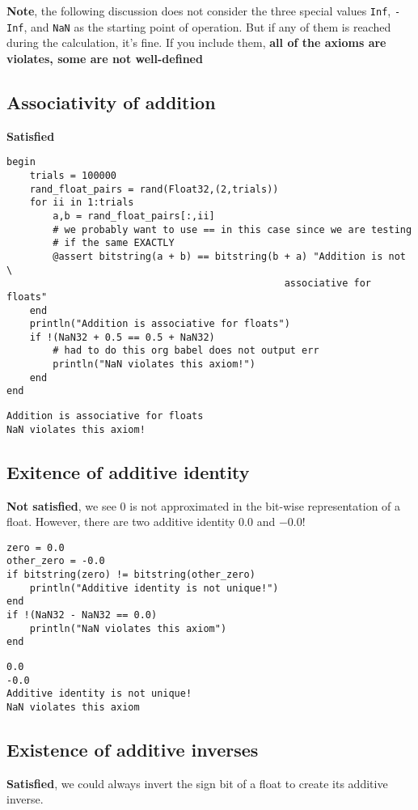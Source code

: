 \documentclass[11pt]{article}
\begin{document}
\textbf{Note}, the following discussion does not consider the three special values
\texttt{Inf}, \texttt{-Inf}, and \texttt{NaN} as the starting point of operation. But if any of them
is reached during the calculation, it's fine. If you include them, \textbf{all of the
axioms are violates, some are not well-defined}

\subsection{Associativity of addition}
\label{sec:org88cb346}
\textbf{Satisfied}

\begin{verbatim}
begin
    trials = 100000
    rand_float_pairs = rand(Float32,(2,trials))
    for ii in 1:trials
        a,b = rand_float_pairs[:,ii]
        # we probably want to use == in this case since we are testing
        # if the same EXACTLY
        @assert bitstring(a + b) == bitstring(b + a) "Addition is not \
                                                associative for floats"
    end
    println("Addition is associative for floats")
    if !(NaN32 + 0.5 == 0.5 + NaN32)
        # had to do this org babel does not output err
        println("NaN violates this axiom!")
    end
end
\end{verbatim}

\begin{verbatim}
Addition is associative for floats
NaN violates this axiom!
\end{verbatim}

\subsection{Exitence of additive identity}
\label{sec:org53c3d43}

\textbf{Not satisfied}, we see \(0\) is not approximated in the bit-wise representation
 of a float. However, there are two additive identity \(0.0\) and \(-0.0\)!
\begin{verbatim}
zero = 0.0
other_zero = -0.0
if bitstring(zero) != bitstring(other_zero)
    println("Additive identity is not unique!")
end
if !(NaN32 - NaN32 == 0.0)
    println("NaN violates this axiom")
end
\end{verbatim}

\begin{verbatim}
0.0
-0.0
Additive identity is not unique!
NaN violates this axiom
\end{verbatim}

\subsection{Existence of additive inverses}
\label{sec:org8944002}
\textbf{Satisfied}, we could always invert the sign bit of a float to create its
 additive inverse.
\end{document}
